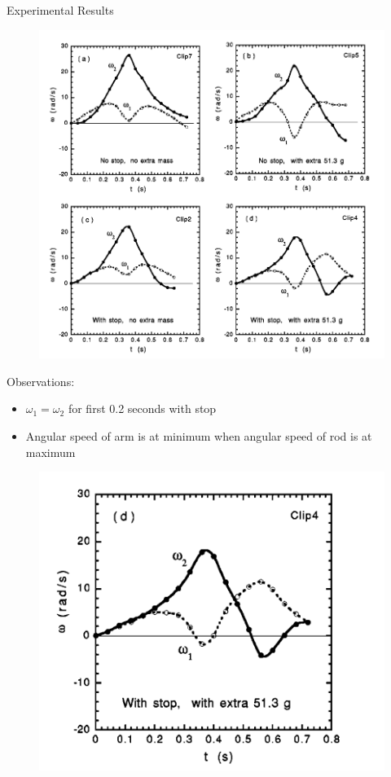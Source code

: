 \documentclass[tikz]{beamer}
\begin{document}
\begin{frame} {Experimental Results}
	\only<3> {
		\begin{figure}
			\centering
			\includegraphics[scale=0.25]{angularvelocities.png}
		\end{figure}
	}

	 {
		Observations:\\
		\begin{itemize}
			\item $\omega_1 = \omega_2$ for first 0.2 seconds with stop
			\item Angular speed of arm is at minimum when angular speed of rod is at maximum
		\end{itemize}

		\begin{figure}
			\centering
			\includegraphics[scale=0.35]{angularvelocityrealistic.png}
		\end{figure}
	}

\end{frame}
\end{document}
